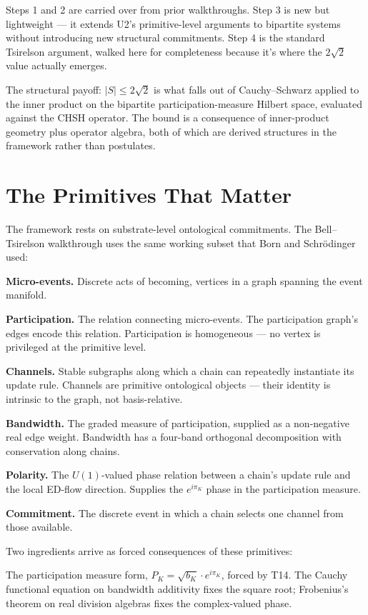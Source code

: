 \documentclass[11pt,a4paper]{article}
\begin{document}
Steps 1 and 2 are carried over from prior walkthroughs. Step 3 is new but lightweight --- it extends U2's primitive-level arguments to bipartite systems without introducing new structural commitments. Step 4 is the standard Tsirelson argument, walked here for completeness because it's where the $2\sqrt{2}$ value actually emerges.

The structural payoff: $|S| \leq 2\sqrt{2}$ is what falls out of Cauchy--Schwarz applied to the inner product on the bipartite participation-measure Hilbert space, evaluated against the CHSH operator. The bound is a consequence of inner-product geometry plus operator algebra, both of which are derived structures in the framework rather than postulates.

\section{The Primitives That Matter}

The framework rests on substrate-level ontological commitments. The Bell--Tsirelson walkthrough uses the same working subset that Born and Schr\"odinger used:

\textbf{Micro-events.} Discrete acts of becoming, vertices in a graph spanning the event manifold.

\textbf{Participation.} The relation connecting micro-events. The participation graph's edges encode this relation. Participation is homogeneous --- no vertex is privileged at the primitive level.

\textbf{Channels.} Stable subgraphs along which a chain can repeatedly instantiate its update rule. Channels are primitive ontological objects --- their identity is intrinsic to the graph, not basis-relative.

\textbf{Bandwidth.} The graded measure of participation, supplied as a non-negative real edge weight. Bandwidth has a four-band orthogonal decomposition with conservation along chains.

\textbf{Polarity.} The $U(1)$-valued phase relation between a chain's update rule and the local ED-flow direction. Supplies the $e^{i\pi_K}$ phase in the participation measure.

\textbf{Commitment.} The discrete event in which a chain selects one channel from those available.

Two ingredients arrive as forced consequences of these primitives:

The participation measure form, $P_K = \sqrt{b_K}\cdot e^{i\pi_K}$, forced by T14. The Cauchy functional equation on bandwidth additivity fixes the square root; Frobenius's theorem on real division algebras fixes the complex-valued phase.
\end{document}
